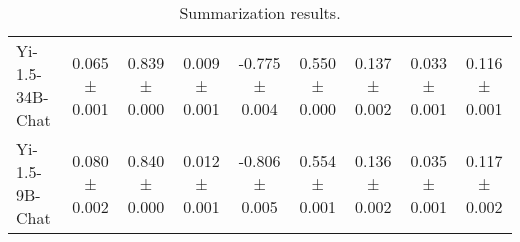 \begin{table*}[h]
{\begin{tabular}{l|cccccccc}
Yi-1.5-34B-Chat & 0.065 ± 0.001	& 0.839 ± 0.000	& 0.009 ± 0.001	& -0.775 ± 0.004	& 0.550 ± 0.000 &	0.137 ± 0.002	& 0.033 ± 0.001	& 0.116 ± 0.001 \\ 
Yi-1.5-9B-Chat & 0.080 ± 0.002 & 0.840 ± 0.000 & 0.012 ± 0.001 & -0.806 ± 0.005 & 0.554 ± 0.001 & 0.136 ± 0.002 & 0.035 ± 0.001 & 0.117 ± 0.002 \\
\bottomrule
\end{tabular}
}
\caption{Summarization results.}
\label{tab:summarization_results}
\end{table*}